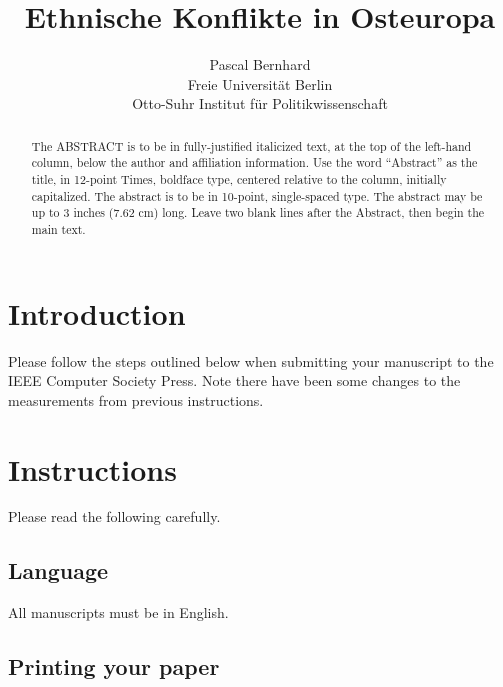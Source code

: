 \documentclass[
10pt,			%
paper=a4,		%
ngerman,		%
BCOR=0pt,		%
DIV=calc,		%
headinclude,	%
headsepline,	%
numbers=noenddot,
twocolumn,
]{article}
\begin{document}
\title{Ethnische Konflikte in Osteuropa}

\author{Pascal Bernhard\\
Freie Universität Berlin\\ Otto-Suhr Institut für Politikwissenschaft}


\maketitle
\thispagestyle{empty}

\begin{abstract}
   The ABSTRACT is to be in fully-justified italicized text, at the top 
   of the left-hand column, below the author and affiliation 
   information. Use the word ``Abstract'' as the title, in 12-point 
   Times, boldface type, centered relative to the column, initially 
   capitalized. The abstract is to be in 10-point, single-spaced type. 
   The abstract may be up to 3 inches (7.62 cm) long. Leave two blank 
   lines after the Abstract, then begin the main text. 
\end{abstract}



\section{Introduction}

Please follow the steps outlined below when submitting your 
manuscript to the IEEE Computer Society Press. Note there have 
been some changes to the measurements from previous instructions. 

\section{Instructions}

Please read the following carefully.

\subsection{Language}

All manuscripts must be in English.

\subsection{Printing your paper}
\end{document}
